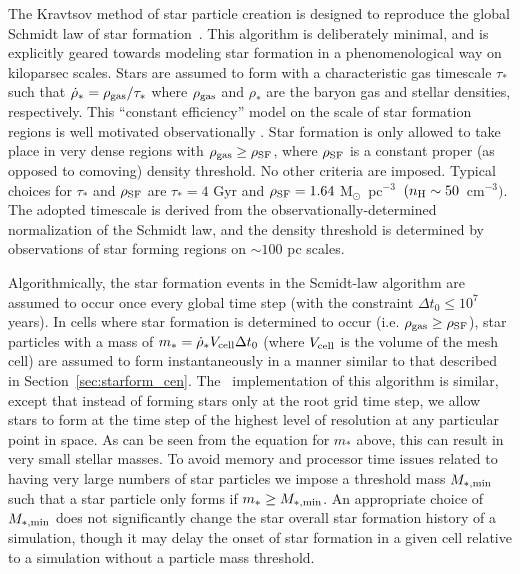 The Kravtsov method of star particle creation is designed to reproduce
the global Schmidt law of star formation~\citep{2003ApJ...590L...1K,
  1959ApJ...129..243S}.  This algorithm is deliberately minimal, and
is explicitly geared towards modeling star formation in a
phenomenological way on kiloparsec scales.  Stars are assumed to form
with a characteristic gas timescale $\tau_*$ such that $\dot{\rho}_* =
\rho_{\rm gas}/\tau_*$ where $\rho_{\rm gas}$ and $\rho_*$ are the
baryon gas and stellar densities, respectively.  This ``constant
efficiency'' model on the scale of star formation regions is well
motivated observationally
\citep{1996AJ....112.1903Y,2002ApJ...569..157W}.  Star formation is
only allowed to take place in very dense regions with $\rho_{\rm gas}
\geq \rho_{\rm SF}$, where $\rho_{\rm SF}$ is a constant proper (as
opposed to comoving) density threshold.  No other criteria are
imposed.  Typical choices for $\tau_*$ and $\rho_{\rm SF}$ are $\tau_*
= 4$ Gyr and $\rho_{\rm SF} = 1.64~$M$_\odot$~pc$^{-3}$~$(n_{\rm H}
\sim 50$~cm$^{-3})$.  The adopted timescale is derived from the
observationally-determined normalization of the Schmidt law, and the
density threshold is determined by observations of star forming
regions on $\sim 100$ pc scales.

Algorithmically, the star formation events in the Scmidt-law algorithm are
assumed to occur once every global time step (with the constraint $\Delta t_0 \leq
10^7$ years).
In cells where star formation is determined to occur (i.e. $\rho_{\rm
  gas} \geq \rho_{\rm SF}$), star particles with a mass of $m_* =
\dot{\rho}_* V_{\rm cell} \Delta t_0$ (where $V_{\rm cell}$ is the
volume of the mesh cell) are assumed to form instantaneously in a
manner similar to that described in Section~\ref{sec:starform_cen}.
The \enzo\ implementation of this algorithm is similar, except that
instead of forming stars only at the root grid time step, we allow
stars to form at the time step of the highest level of resolution at
any particular point in space.  As can be seen from the equation for
$m_*$ above, this can result in very small stellar masses.  To avoid
memory and processor time issues related to having very large numbers
of star particles we impose a threshold mass $M_{\rm *,min}$ such that
a star particle only forms if $m_* \geq M_{\rm *,min}$.  An
appropriate choice of $M_{\rm *,min}$ does not significantly change
the star overall star formation history of a simulation, though it may
delay the onset of star formation in a given cell relative to a
simulation without a particle mass threshold.

